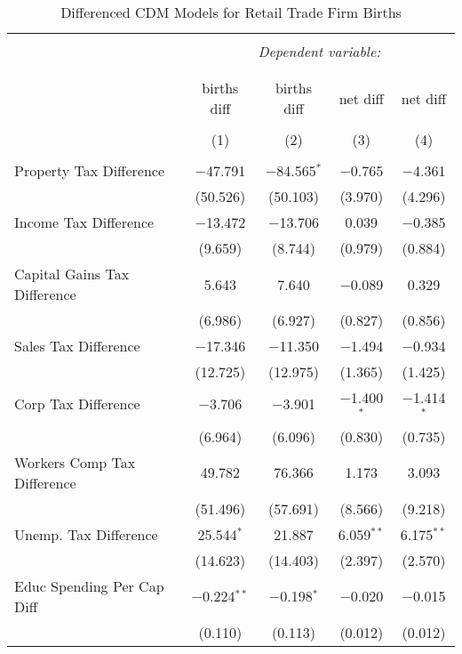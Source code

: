
\begin{table}[!htbp] \centering 
  \caption{Differenced CDM Models for  Retail Trade Firm Births} 
  \label{} 
\begin{tabular}{@{\extracolsep{5pt}}lcccc} 
\\[-1.8ex]\hline 
\hline \\[-1.8ex] 
 & \multicolumn{4}{c}{\textit{Dependent variable:}} \\ 
\cline{2-5} 
\\[-1.8ex] & \multicolumn{4}{c}{ } \\ 
 & births diff & births diff & net diff & net diff \\ 
\\[-1.8ex] & (1) & (2) & (3) & (4)\\ 
\hline \\[-1.8ex] 
 Property Tax Difference & $-$47.791 & $-$84.565$^{*}$ & $-$0.765 & $-$4.361 \\ 
  & (50.526) & (50.103) & (3.970) & (4.296) \\ 
  Income Tax Difference & $-$13.472 & $-$13.706 & 0.039 & $-$0.385 \\ 
  & (9.659) & (8.744) & (0.979) & (0.884) \\ 
  Capital Gains Tax Difference & 5.643 & 7.640 & $-$0.089 & 0.329 \\ 
  & (6.986) & (6.927) & (0.827) & (0.856) \\ 
  Sales Tax Difference & $-$17.346 & $-$11.350 & $-$1.494 & $-$0.934 \\ 
  & (12.725) & (12.975) & (1.365) & (1.425) \\ 
  Corp Tax Difference & $-$3.706 & $-$3.901 & $-$1.400$^{*}$ & $-$1.414$^{*}$ \\ 
  & (6.964) & (6.096) & (0.830) & (0.735) \\ 
  Workers Comp Tax Difference & 49.782 & 76.366 & 1.173 & 3.093 \\ 
  & (51.496) & (57.691) & (8.566) & (9.218) \\ 
  Unemp. Tax Difference & 25.544$^{*}$ & 21.887 & 6.059$^{**}$ & 6.175$^{**}$ \\ 
  & (14.623) & (14.403) & (2.397) & (2.570) \\ 
  Educ Spending Per Cap Diff & $-$0.224$^{**}$ & $-$0.198$^{*}$ & $-$0.020 & $-$0.015 \\ 
  & (0.110) & (0.113) & (0.012) & (0.012) \\ 

\end{tabular}
\end{table}
